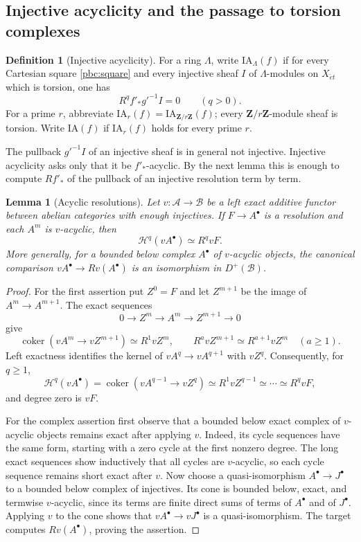 \documentclass[11pt,a4paper]{article}
\numberwithin{equation}{section}
\newtheorem{lemma}[theorem]{Lemma}
\theoremstyle{definition}
\newtheorem{definition}[theorem]{Definition}
\theoremstyle{remark}
\newcommand{\et}{\acute{e}t}
\newcommand{\Z}{\mathbf Z}
\begin{document}
\subsection{Injective acyclicity and the passage to torsion complexes}

\begin{definition}[Injective acyclicity]\label{pbc:ia}
For a ring $\Lambda$, write $\mathrm{IA}_{\Lambda}(f)$ if for every
Cartesian square \eqref{pbc:square} and every injective sheaf $I$ of
$\Lambda$-modules on $X_{\et}$ which is torsion, one has
\[
 R^qf'_*g'^{-1}I=0\qquad(q>0).
\]
For a prime $r$, abbreviate
$\mathrm{IA}_r(f)=\mathrm{IA}_{\Z/r\Z}(f)$; every
$\Z/r\Z$-module sheaf is torsion. Write $\mathrm{IA}(f)$ if
$\mathrm{IA}_r(f)$ holds for every prime $r$.
\end{definition}

The pullback $g'^{-1}I$ of an injective sheaf is in general not
injective. Injective acyclicity asks only that it be $f'_*$-acyclic.
By the next lemma this is enough to compute $Rf'_*$ of the pullback of
an injective resolution term by term.

\begin{lemma}[Acyclic resolutions]\label{pbc:acyclicity}
Let $v:\mathcal A\to\mathcal B$ be a left exact additive functor
between abelian categories with enough injectives. If
$F\to A^\bullet$ is a resolution and each $A^m$ is $v$-acyclic, then
\[
 \mathcal H^q(vA^\bullet)\simeq R^qvF.
\]
More generally, for a bounded below complex $A^\bullet$ of
$v$-acyclic objects, the canonical comparison
$vA^\bullet\to Rv(A^\bullet)$ is an isomorphism in $D^+(\mathcal B)$.
\end{lemma}
\begin{proof}
For the first assertion put $Z^0=F$ and let $Z^{m+1}$ be the image of
$A^m\to A^{m+1}$. The exact sequences
\[
 0\longrightarrow Z^m\longrightarrow A^m\longrightarrow
 Z^{m+1}\longrightarrow0
\]
give
\[
 \operatorname{coker}(vA^m\to vZ^{m+1})\simeq R^1vZ^m,
 \qquad R^avZ^{m+1}\simeq R^{a+1}vZ^m\quad(a\geq1).
\]
Left exactness identifies the kernel of
$vA^q\to vA^{q+1}$ with $vZ^q$. Consequently, for $q\geq1$,
\[
 \mathcal H^q(vA^\bullet)
 =\operatorname{coker}(vA^{q-1}\to vZ^q)
 \simeq R^1vZ^{q-1}\simeq\cdots\simeq R^qvF,
\]
and degree zero is $vF$.

For the complex assertion first observe that a bounded below exact
complex of $v$-acyclic objects remains exact after applying $v$.
Indeed, its cycle sequences have the same form, starting with a zero
cycle at the first nonzero degree. The long exact sequences show
inductively that all cycles are $v$-acyclic, so each cycle sequence
remains short exact after $v$. Now choose a quasi-isomorphism
$A^\bullet\to J^\bullet$ to a bounded below complex of injectives.
Its cone is bounded below, exact, and termwise $v$-acyclic, since its
terms are finite direct sums of terms of $A^\bullet$ and of
$J^\bullet$. Applying $v$ to the cone shows that
$vA^\bullet\to vJ^\bullet$ is a quasi-isomorphism. The target
computes $Rv(A^\bullet)$, proving the assertion.
\end{proof}
\end{document}
